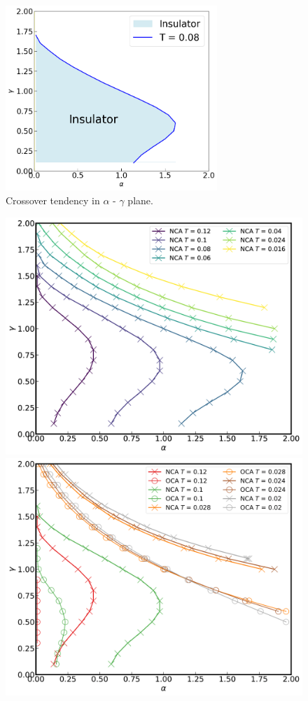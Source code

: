 \documentclass{article}[12pt]
\begin{document}
\begin{spacing}{1.5}
\begin{figure}[H]
  \centerline{\includegraphics[width=8cm]{TexFigure/Simplefig.png}}
  \caption{Crossover tendency in $\alpha$ - $\gamma$ plane.}
\end{figure}
\pagebreak
\newpage
\begin{figure}[H]
  \centerline{\includegraphics[width=12cm]{TexFigure/3dplot_Ns3_proj_n-1.png}}
  \centerline{\includegraphics[width=12cm]{TexFigure/3dplot_COMP3_proj_n-1.png}}

\end{figure}
\end{spacing}
\end{document}
